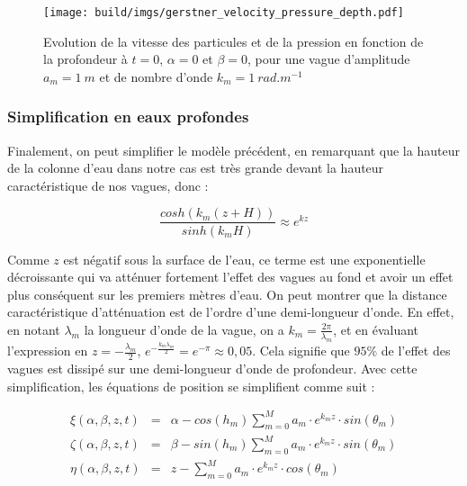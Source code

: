 				\begin{figure}[!htb]
					\centering
					\texttt{[image: build/imgs/gerstner\_velocity\_pressure\_depth.pdf]}
					\caption{Evolution de la vitesse des particules et de la pression en fonction de la profondeur à $t=0$, $\alpha=0$ et $\beta=0$, pour une vague d'amplitude $a_m=1\ m$ et de nombre d'onde $k_m = 1\ rad.m^{-1}$}
					\label{fig:speed_pressure_depth}
				\end{figure}

			\subsubsection{Simplification en eaux profondes}
			\label{sec:simplification_eaux_profondes}
			
				Finalement, on peut simplifier le modèle précédent, en remarquant que la hauteur de la colonne d'eau dans notre cas est très grande devant la hauteur caractéristique de nos vagues, donc :

				\begin{equation}\frac{cosh(k_m(z+H))}{sinh(k_mH)} \approx e^{kz} \label{eqn:simplification_eaux_profondes}\end{equation}

				Comme $z$ est négatif sous la surface de l'eau, ce terme est une exponentielle décroissante qui va atténuer fortement l'effet des vagues au fond et avoir un effet plus conséquent sur les premiers mètres d'eau. On peut montrer que la distance caractéristique d'atténuation est de l'ordre d'une demi-longueur d'onde. En effet, en notant $\lambda_m$ la longueur d'onde de la vague, on a $k_m = \tfrac{2\pi}{\lambda_m}$, et en évaluant l'expression en $z = - \tfrac{\lambda_m}{2}$, $e^{-\tfrac{k_m\lambda_m}{2}} = e^{-\pi} \approx 0,05$. Cela signifie que $95 \%$ de l'effet des vagues est dissipé sur une demi-longueur d'onde de profondeur. Avec cette simplification, les équations de position se simplifient comme suit :
			
				\begin{eqnarray}
					\xi(\alpha, \beta, z, t) & = & \alpha - cos(h_m) \sum_{m=0}^M a_m \cdot e^{k_mz} \cdot sin(\theta_m) \\
					\zeta(\alpha, \beta, z, t) & = & \beta - sin(h_m) \sum_{m=0}^M a_m \cdot e^{k_mz} \cdot sin(\theta_m) \\
					\eta(\alpha, \beta, z, t) & = & z - \sum_{m=0}^M a_m \cdot e^{k_mz} \cdot cos(\theta_m) \\
				\end{eqnarray}


